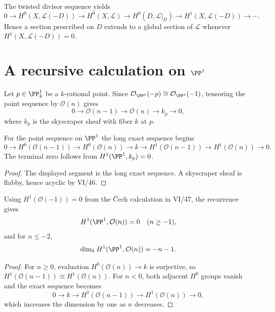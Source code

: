 \begin{corollary}\label{cor:vi48-divisor-les}
The twisted divisor sequence yields
\[
0\to H^0(X,\mathcal L(-D))\to H^0(X,\mathcal L)\to H^0(D,\mathcal L|_D)
\to H^1(X,\mathcal L(-D))\to\cdots .
\]
Hence a section prescribed on $D$ extends to a global section of $\mathcal L$ whenever $H^1(X,\mathcal L(-D))=0$.
\end{corollary}

\section{A recursive calculation on \texorpdfstring{$\PP^1$}{P1}}

\begin{example}[A point on $\PP^1$]\label{ex:vi48-p1-point}
Let $p\in\PP^1_k$ be a $k$-rational point.  Since $\mathcal O_{\PP^1}(-p)\cong\mathcal O_{\PP^1}(-1)$, tensoring the point sequence by $\mathcal O(n)$ gives
\[
0\to\mathcal O(n-1)\to\mathcal O(n)\to k_p\to0,
\]
where $k_p$ is the skyscraper sheaf with fiber $k$ at $p$.
\end{example}

\begin{proposition}\label{prop:vi48-p1-recurrence}
For the point sequence on $\PP^1$ the long exact sequence begins
\[
0\to H^0(\mathcal O(n-1))\to H^0(\mathcal O(n))\to k
\to H^1(\mathcal O(n-1))\to H^1(\mathcal O(n))\to0.
\]
The terminal zero follows from $H^1(\PP^1,k_p)=0$.
\begin{proof}
The displayed segment is the long exact sequence.  A skyscraper sheaf is flabby, hence acyclic by VI/46.
\end{proof}
\end{proposition}

\begin{corollary}\label{cor:vi48-p1-dimensions}
Using $H^1(\mathcal O(-1))=0$ from the \v{C}ech calculation in VI/47, the recurrence gives
\[
H^1(\PP^1,\mathcal O(n))=0\quad(n\ge-1),
\]
and for $n\le-2$,
\[
\dim_k H^1(\PP^1,\mathcal O(n))=-n-1.
\]
\begin{proof}
For $n\ge0$, evaluation $H^0(\mathcal O(n))\to k$ is surjective, so $H^1(\mathcal O(n-1))\cong H^1(\mathcal O(n))$.  For $n<0$, both adjacent $H^0$ groups vanish and the exact sequence becomes
\[
0\to k\to H^1(\mathcal O(n-1))\to H^1(\mathcal O(n))\to0,
\]
which increases the dimension by one as $n$ decreases.
\end{proof}
\end{corollary}

